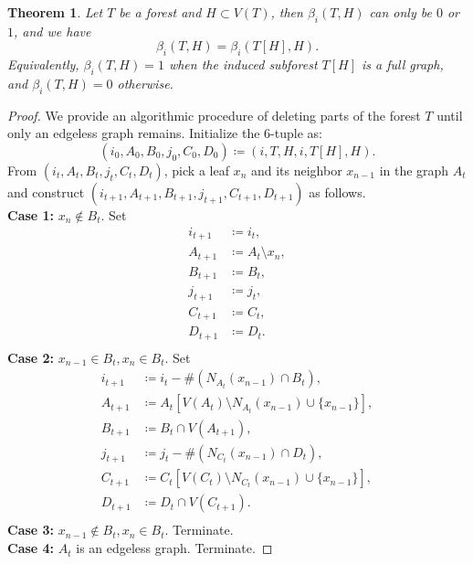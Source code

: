 \documentclass[dvipsnames,10pt]{article}
\newtheorem{theorem}{Theorem}[section]
\begin{document}
\begin{theorem}
    Let $T$ be a forest and $H\subset V(T)$, then $\beta_i(T,H)$ can only be $0$ or $1$, and we have
    \begin{equation*}
        \beta_i(T,H)=\beta_i(T[H],H).
    \end{equation*}
    Equivalently, $\beta_i(T,H)=1$ when the induced subforest $T[H]$ is a full graph, and $\beta_i(T,H)=0$ otherwise.
\end{theorem}

\begin{proof}
    We provide an algorithmic procedure of deleting parts of the forest $T$ until only an edgeless graph remains. Initialize the $6$-tuple as:
    \begin{equation*}
        (i_0,A_0,B_0,j_0,C_0,D_0)\coloneq (i,T,H,i,T[H],H).
    \end{equation*}
    From $(i_t,A_t,B_t,j_t,C_t,D_t)$, pick a leaf $x_n$ and its neighbor $x_{n-1}$ in the graph $A_t$ and construct $(i_{t+1},A_{t+1},B_{t+1},j_{t+1},C_{t+1},D_{t+1})$ as follows.\\
    \textbf{Case 1:} $x_n\notin B_t$. Set
    \begin{align*}
        i_{t+1}&\coloneq i_t,\\
        A_{t+1}&\coloneq A_t\setminus x_n,\\
        B_{t+1}&\coloneq B_t,\\
        j_{t+1}&\coloneq j_t,\\
        C_{t+1}&\coloneq C_t,\\
        D_{t+1}&\coloneq D_t.\\
    \end{align*}
    \textbf{Case 2:} $x_{n-1}\in B_t,x_n\in B_t$. Set
    \begin{align*}
        i_{t+1}&\coloneq i_t-\#(N_{A_t}(x_{n-1})\cap B_t),\\
        A_{t+1}&\coloneq A_t[V(A_t)\setminus N_{A_t}(x_{n-1})\cup\{x_{n-1}\}],\\
        B_{t+1}&\coloneq B_t\cap V(A_{t+1}),\\
        j_{t+1}&\coloneq j_t-\#(N_{C_t}(x_{n-1})\cap D_t),\\
        C_{t+1}&\coloneq C_t[V(C_t)\setminus N_{C_t}(x_{n-1})\cup\{x_{n-1}\}],\\
        D_{t+1}&\coloneq D_t\cap V(C_{t+1}).\\
    \end{align*}
    \textbf{Case 3:} $x_{n-1}\notin B_t,x_n\in B_t$. Terminate.\\
    \textbf{Case 4:} $A_t$ is an edgeless graph. Terminate.


\end{proof}
\end{document}

